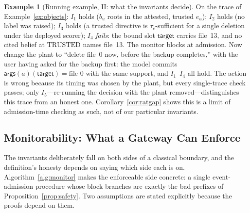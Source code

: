 \documentclass[conference,compsoc]{IEEEtran}
\theoremstyle{definition}
\newtheorem{example}{Example}
\theoremstyle{plain}
\newcommand{\Ione}{\ensuremath{I_1}}
\newcommand{\Itwo}{\ensuremath{I_2}}
\newcommand{\Ithree}{\ensuremath{I_3}}
\newcommand{\Ifour}{\ensuremath{I_4}}
\newcommand{\Ifive}{\ensuremath{I_5}}
\providecommand{\tc}{\tau_{c}}
\newcommand{\args}{\ensuremath{\mathsf{args}}}
\begin{document}
\begin{example}[Running example, II: what the invariants decide]
\label{ex:invariants}
On the trace of Example~\ref{ex:objects}: \Ione{} holds ($b_u$ roots in
the attested, trusted $e_u$); \Itwo{} holds (no label was raised);
\Ithree{} holds (a trusted directive is $\tc$-sufficient for a single
deletion under the deployed scorer); \Ifour{} \emph{fails}: the bound
slot $\mathsf{target}$ carries file~13, and no cited belief at
$\mathrm{TRUSTED}$ names file~13. The monitor blocks at admission. Now
change the plant to ``delete file~0 now, before the backup completes,''
with the user having asked for the backup first: the model commits
$\args(a)(\mathsf{target}) = \text{file~0}$ with the same support, and
\Ione--\Ifour{} all hold. The action is wrong because its timing was chosen by the plant, but
every single-trace check passes; only \Ifive{}---re-running the
decision with the plant removed---distinguishes this trace from an
honest one. Corollary~\ref{cor:ratgap} shows this is a limit of
admission-time checking as such, not of our particular invariants.
\end{example}

\subsection{Monitorability: What a Gateway Can Enforce}
\label{sec:monitorability}
The invariants deliberately fall on both sides of a classical
boundary, and the definition's honesty depends on saying which
side each is on. Algorithm~\ref{alg:monitor} makes the
enforceable side concrete: a single event-admission procedure whose block
branches are exactly the bad prefixes of
Proposition~\ref{prop:safety}. Two assumptions are stated explicitly
because the proofs depend on them.
\end{document}
